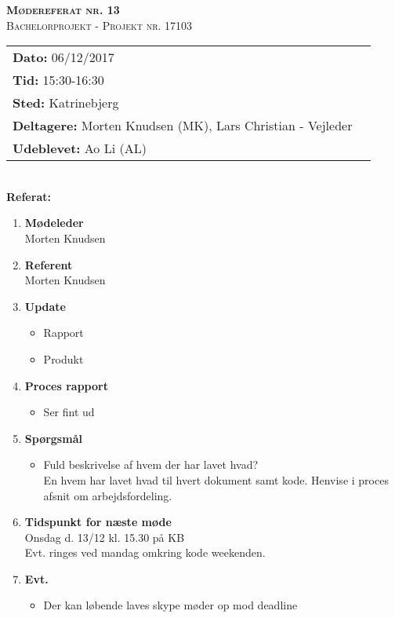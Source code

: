 
\newcommand{\HRule}{\rule{\linewidth}{0.1mm}}


	\begin{center}
		{\huge \bfseries \textsc{Mødereferat nr. 13}}\\
		\textsc{\large Bachelorprojekt - Projekt nr. 17103}\\[0.3cm]
	\end{center}
	\begin{tabular}{ll}
	\large \textbf{Dato:} 06/12/2017  	\\ %
	\large \textbf{Tid:}  15:30-16:30 	\\ %
	\large \textbf{Sted:} Katrinebjerg		\\ %
	\large \textbf{Deltagere:} Morten Knudsen (MK), Lars Christian - Vejleder \\
	\large \textbf{Udeblevet:} Ao Li (AL)
	\end{tabular}\\
	\phantom{\,}\hspace{0.1em} \large \textbf{Referat:}
	\begin{enumerate}
		\itemsep 0.3em 
		\item \textbf{Mødeleder}\\
			Morten Knudsen
		\item \textbf{Referent}\\
			Morten Knudsen

		\item \textbf{Update}
			\begin{itemize}[-]
				\item Rapport 
				\item Produkt
								
			\end{itemize}
		
		\item \textbf{Proces rapport}
		\begin{itemize}[-]
			\item Ser fint ud
		\end{itemize}
			
		\item \textbf{Spørgsmål}
			\begin{itemize}[-]
				\item Fuld beskrivelse af hvem der har lavet hvad? \\
				En hvem har lavet hvad til hvert dokument samt kode. Henvise i proces afsnit om arbejdsfordeling.				
			\end{itemize}
	
		\item \textbf{Tidspunkt for næste møde} \\
			Onsdag d. 13/12 kl. 15.30 på KB \\
			Evt. ringes ved mandag omkring kode weekenden.
			
		\item \textbf{Evt.}
			\begin{itemize}[-]
				\item Der kan løbende laves skype møder op mod deadline
			\end{itemize}
			
	\end{enumerate}
